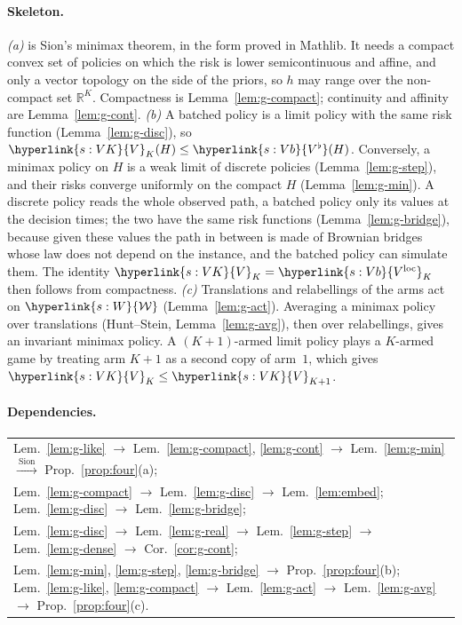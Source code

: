\documentclass[11pt]{article}
\DeclareRobustCommand{\sy}[2]{{\hyperlink{#1}{#2}}}
\newcommand{\R}{\mathbb{R}}
\newcommand{\1}{\mathbf{1}}
\newcommand{\Wc}{\sy{s:W}{\mathcal W}}
\newcommand{\VK}{\sy{s:VK}{V}}
\newcommand{\Vb}{\sy{s:Vb}{V^\flat}}
\newcommand{\Vloc}{\sy{s:Vb}{V^{\mathrm{loc}}}}
\begin{document}
\paragraph{Skeleton.} \emph{(a)} is Sion's minimax theorem, in the form proved in Mathlib. It needs a compact convex set of policies on which the risk is lower
semicontinuous and affine, and only a vector topology on the side of the priors, so $h$ may range over the non-compact set $\R^K$. Compactness is Lemma~\ref{lem:g-compact}; continuity and affinity are
Lemma~\ref{lem:g-cont}.
\emph{(b)} A batched policy is a limit policy with the same risk function (Lemma~\ref{lem:g-disc}), so $\VK_K(H)\le\Vb(H)$. Conversely, a minimax policy on $H$ is a
weak limit of discrete policies (Lemma~\ref{lem:g-step}), and their risks converge uniformly on the compact $H$ (Lemma~\ref{lem:g-min}). A discrete policy reads the
whole observed path, a batched policy only its values at the decision times; the two have the same risk functions (Lemma~\ref{lem:g-bridge}), because given these
values the path in between is made of Brownian bridges whose law does not depend on the instance, and the batched policy can simulate them. The identity
$\VK_K=\Vloc_K$ then follows from compactness.
\emph{(c)} Translations and relabellings of the arms act on $\Wc$ (Lemma~\ref{lem:g-act}). Averaging a minimax policy over translations (Hunt--Stein,
Lemma~\ref{lem:g-avg}), then over relabellings, gives an invariant minimax policy. A $(K+1)$-armed limit policy plays a $K$-armed game by treating arm $K+1$ as a
second copy of arm~$1$, which gives $\VK_K\le\VK_{K+1}$.

\paragraph{Dependencies.}
\begin{center}\small
\begin{tabular}{l}
Lem.~\ref{lem:g-like} $\to$ Lem.~\ref{lem:g-compact}, \ref{lem:g-cont} $\to$ Lem.~\ref{lem:g-min} $\xrightarrow{\ \text{Sion}\ }$ Prop.~\ref{prop:four}(a);\\[1mm]
Lem.~\ref{lem:g-compact} $\to$ Lem.~\ref{lem:g-disc} $\to$ Lem.~\ref{lem:embed};\quad
Lem.~\ref{lem:g-disc} $\to$ Lem.~\ref{lem:g-bridge};\\[1mm]
Lem.~\ref{lem:g-disc} $\to$ Lem.~\ref{lem:g-real} $\to$ Lem.~\ref{lem:g-step} $\to$ Lem.~\ref{lem:g-dense} $\to$ Cor.~\ref{cor:g-cont};\\[1mm]
Lem.~\ref{lem:g-min}, \ref{lem:g-step}, \ref{lem:g-bridge} $\to$ Prop.~\ref{prop:four}(b);\quad
Lem.~\ref{lem:g-like}, \ref{lem:g-compact} $\to$ Lem.~\ref{lem:g-act} $\to$ Lem.~\ref{lem:g-avg} $\to$ Prop.~\ref{prop:four}(c).
\end{tabular}
\end{center}
\end{document}
